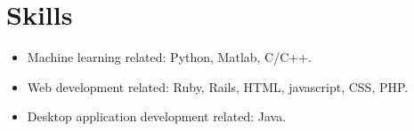 \documentclass[letterpaper]{article}
\begin{document}
\section*{Skills}
\begin{itemize}
\item Machine learning related: Python, Matlab, C/C++.
\item Web development related: Ruby, Rails, HTML, javascript, CSS, PHP.
\item Desktop application development related: Java.
\end{itemize}
\end{document}
